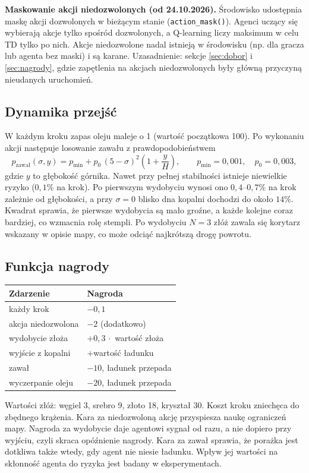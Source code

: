 \documentclass[11pt,a4paper]{article}
\begin{document}
\textbf{Maskowanie akcji niedozwolonych (od 24.10.2026).} Środowisko udostępnia
maskę akcji dozwolonych w bieżącym stanie (\texttt{action\_mask()}). Agenci uczący
się wybierają akcje tylko spośród dozwolonych, a Q-learning liczy maksimum w celu
TD tylko po nich. Akcje niedozwolone nadal istnieją w środowisku (np. dla gracza
lub agenta bez maski) i są karane. Uzasadnienie: sekcje \ref{sec:dobor}
i \ref{sec:nagrody}, gdzie zapętlenia na akcjach niedozwolonych były główną
przyczyną nieudanych uruchomień.

\subsection{Dynamika przejść}
W każdym kroku zapas oleju maleje o 1 (wartość początkowa 100). Po wykonaniu
akcji następuje losowanie zawału z prawdopodobieństwem
\[
  p_{\text{zawał}}(\sigma, y) = p_{\min} + p_0 \,(5 - \sigma)^{2}\left(1 + \frac{y}{H}\right),
  \qquad p_{\min} = 0{,}001,\quad p_0 = 0{,}003,
\]
gdzie $y$ to głębokość górnika. Nawet przy pełnej stabilności istnieje
niewielkie ryzyko ($0{,}1\%$ na krok). Po pierwszym wydobyciu wynosi ono
$0{,}4$--$0{,}7\%$ na krok zależnie od głębokości, a przy $\sigma = 0$ blisko
dna kopalni dochodzi do około $14\%$. Kwadrat sprawia, że pierwsze wydobycia są
mało groźne, a każde kolejne coraz bardziej, co wzmacnia rolę stempli.
Po wydobyciu $N=3$ złóż zawala się korytarz wskazany w opisie mapy, co może
odciąć najkrótszą drogę powrotu.

\subsection{Funkcja nagrody}
\begin{center}
\begin{tabular}{@{}ll@{}}
\toprule
Zdarzenie & Nagroda \\
\midrule
każdy krok & $-0{,}1$ \\
akcja niedozwolona & $-2$ (dodatkowo) \\
wydobycie złoża & $+0{,}3\,\cdot$ wartość złoża \\
wyjście z kopalni & $+$wartość ładunku \\
zawał & $-10$, ładunek przepada \\
wyczerpanie oleju & $-20$, ładunek przepada \\
\bottomrule
\end{tabular}
\end{center}
Wartości złóż: węgiel 3, srebro 9, złoto 18, kryształ 30.
Koszt kroku zniechęca do zbędnego krążenia. Kara za niedozwoloną akcję
przyspiesza naukę ograniczeń mapy. Nagroda za wydobycie daje agentowi sygnał
od razu, a nie dopiero przy wyjściu, czyli skraca opóźnienie nagrody. Kara za
zawał sprawia, że porażka jest dotkliwa także wtedy, gdy agent nie niesie ładunku.
Wpływ jej wartości na skłonność agenta do ryzyka jest badany w eksperymentach.
\end{document}
